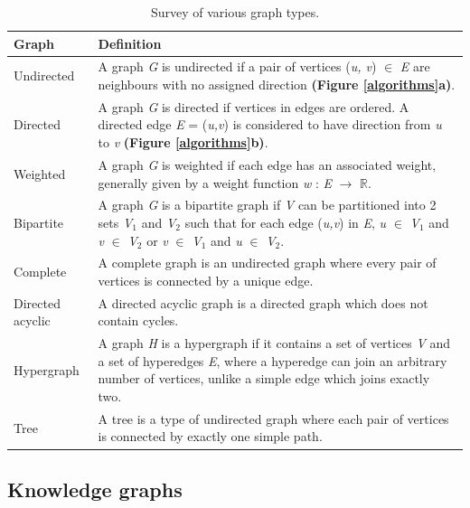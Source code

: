 \begin{table}[ht]
\raggedleft
\begin{tabularx}{\textwidth}{lX}
\hline
\textbf{Graph}  & \textbf{Definition} \\ \hline
Undirected & A graph \textit{G} is undirected if a pair of vertices (\textit{u, v}) $\in$ \textit{E} are neighbours with no assigned direction \textbf{(Figure \ref{algorithms}a)}. \\ \hline
Directed & A graph \textit{G} is directed if vertices in edges are ordered. A directed edge \textit{E} = (\textit{u,v}) is considered to have direction from \textit{u} to \textit{v} \textbf{(Figure \ref{algorithms}b)}. \\ \hline
Weighted & A graph \textit{G} is weighted if each edge has an associated weight, generally given by a weight function \textit{w} : \textit{E} $\rightarrow$ $\mathbb{R}$. \\ \hline
Bipartite & A graph \textit{G} is a bipartite graph if \textit{V} can be partitioned into 2 sets \textit{V}$_{1}$ and \textit{V}$_{2}$ such that for each edge (\textit{u,v}) in \textit{E}, \textit{u} $\in$ \textit{V}$_{1}$ and \textit{v} $\in$ \textit{V}$_{2}$ or \textit{v} $\in$ \textit{V}$_{1}$ and \textit{u} $\in$ \textit{V}$_{2}$. \\ \hline
Complete & A complete graph is an undirected graph where every pair of vertices is connected by a unique edge. \\ \hline
Directed acyclic & A directed acyclic graph is a directed graph which does not contain cycles.  \\ \hline
Hypergraph & A graph \textit{H} is a hypergraph if it contains a set of vertices \textit{V} and a set of hyperedges \textit{E}, where a hyperedge can join an arbitrary number of vertices, unlike a simple edge which joins exactly two. \\ \hline
Tree & A tree is a type of undirected graph where each pair of vertices is connected by exactly one simple path. \\ \hline
\end{tabularx}
    \caption{Survey of various graph types.}
    \label{graphs}
\end{table}

\subsection{Knowledge graphs}

